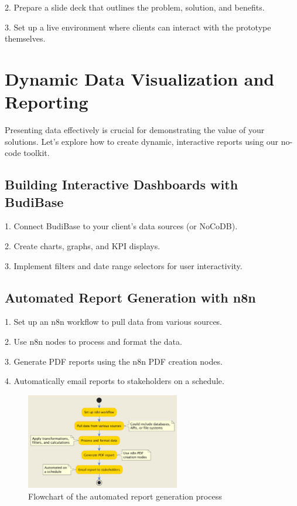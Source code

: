 2. Prepare a slide deck that outlines the problem, solution, and benefits.

3. Set up a live environment where clients can interact with the prototype themselves.


\section{Dynamic Data Visualization and Reporting}

Presenting data effectively is crucial for demonstrating the value of your solutions. Let's explore how to create dynamic, interactive reports using our no-code toolkit.

\subsection{Building Interactive Dashboards with BudiBase}

1. Connect BudiBase to your client's data sources (or NoCoDB).

2. Create charts, graphs, and KPI displays.


3. Implement filters and date range selectors for user interactivity.


\subsection{Automated Report Generation with n8n}

1. Set up an n8n workflow to pull data from various sources.

2. Use n8n nodes to process and format the data.

3. Generate PDF reports using the n8n PDF creation nodes.

4. Automatically email reports to stakeholders on a schedule.

\begin{figure}
    \centering
    \includegraphics[width=0.6\textwidth]{./figures/automated_report_generation_flowchart.png}
    \caption{Flowchart of the automated report generation process}
    \label{fig:automated-report-generation}
\end{figure}
